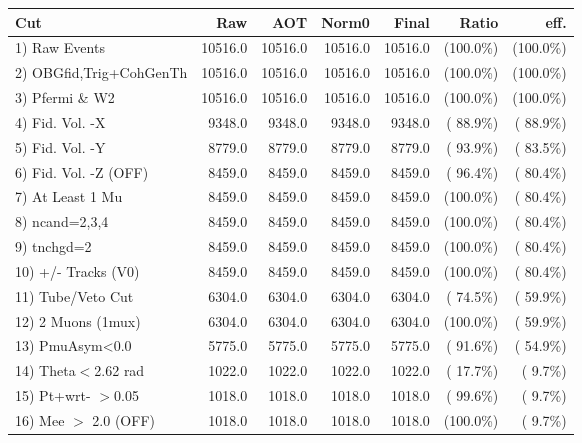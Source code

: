  \begin{table}[h!]\centering
 \begin{tabular}{||l||r|r|r|r|r|r||}
 \hline
 \hline
 Cut & Raw & AOT & Norm0 & Final & Ratio & eff.       \\
 \hline
  1) Raw Events           &      10516.0 &      10516.0 &      10516.0 &      10516.0 & (100.0\%) & (100.0\%) \\
  2) OBGfid,Trig+CohGenTh &      10516.0 &      10516.0 &      10516.0 &      10516.0 & (100.0\%) & (100.0\%) \\
  3) Pfermi \& W2         &      10516.0 &      10516.0 &      10516.0 &      10516.0 & (100.0\%) & (100.0\%) \\
  4) Fid. Vol. -X         &       9348.0 &       9348.0 &       9348.0 &       9348.0 & ( 88.9\%) & ( 88.9\%) \\
  5) Fid. Vol. -Y         &       8779.0 &       8779.0 &       8779.0 &       8779.0 & ( 93.9\%) & ( 83.5\%) \\
  6) Fid. Vol. -Z (OFF)   &       8459.0 &       8459.0 &       8459.0 &       8459.0 & ( 96.4\%) & ( 80.4\%) \\
  7) At Least 1 Mu        &       8459.0 &       8459.0 &       8459.0 &       8459.0 & (100.0\%) & ( 80.4\%) \\
  8) ncand=2,3,4          &       8459.0 &       8459.0 &       8459.0 &       8459.0 & (100.0\%) & ( 80.4\%) \\
  9) tnchgd=2             &       8459.0 &       8459.0 &       8459.0 &       8459.0 & (100.0\%) & ( 80.4\%) \\
 10) +/- Tracks (V0)      &       8459.0 &       8459.0 &       8459.0 &       8459.0 & (100.0\%) & ( 80.4\%) \\
 11) Tube/Veto Cut        &       6304.0 &       6304.0 &       6304.0 &       6304.0 & ( 74.5\%) & ( 59.9\%) \\
 12) 2 Muons (1mux)       &       6304.0 &       6304.0 &       6304.0 &       6304.0 & (100.0\%) & ( 59.9\%) \\
 13) PmuAsym<0.0          &       5775.0 &       5775.0 &       5775.0 &       5775.0 & ( 91.6\%) & ( 54.9\%) \\
 14) Theta$<$2.62 rad     &       1022.0 &       1022.0 &       1022.0 &       1022.0 & ( 17.7\%) & (  9.7\%) \\
 15) Pt+wrt- $>$0.05      &       1018.0 &       1018.0 &       1018.0 &       1018.0 & ( 99.6\%) & (  9.7\%) \\
 16) Mee $>$ 2.0  (OFF)   &       1018.0 &       1018.0 &       1018.0 &       1018.0 & (100.0\%) & (  9.7\%) \\

\end{tabular}
\end{table}
